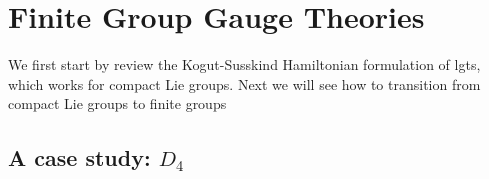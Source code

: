 \chapter{Finite Group Gauge Theories}
\label{chap:finite_group_gauge_theories}


We first start by review the Kogut-Susskind Hamiltonian formulation of \acp{lgt}, which works for compact Lie groups.
Next we will see how to transition from compact Lie groups to finite groups










\section{A case study: \texorpdfstring{$D_4$}{D4}}
\label{sec:a_case_study_d4}

